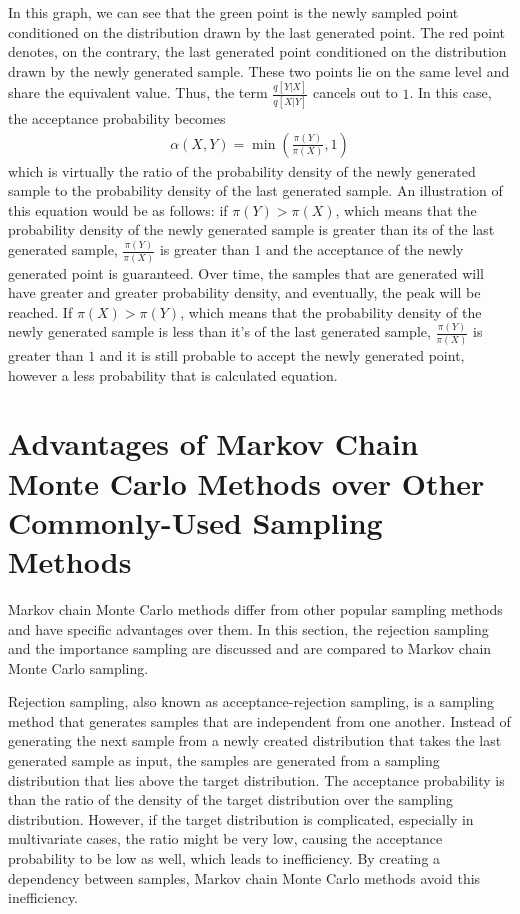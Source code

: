 In this graph, we can see that the green point is the newly sampled point conditioned on the distribution drawn by the last generated point. The red point denotes, on the contrary, the last generated point conditioned on the distribution drawn by the newly generated sample. These two points lie on the same level and share the equivalent value. Thus, the term $\frac{q[Y|X]}{q[X|Y]}$ cancels out to $1$. In this case, the acceptance probability becomes
\begin{align}
\alpha(X, Y) = \min (\frac{\pi(Y)}{\pi(X)}, 1)
\end{align}
which is virtually the ratio of the probability density of the newly generated sample to the probability density of the last generated sample. An illustration of this equation would be as follows: if $\pi(Y) > \pi(X)$, which means that the probability density of the newly generated sample is greater than its of the last generated sample, $\frac{\pi(Y)}{\pi(X)}$ is greater than $1$ and the acceptance of the newly generated point is guaranteed. Over time, the samples that are generated will have greater and greater probability density, and eventually, the peak will be reached. If $\pi(X) > \pi(Y)$, which means that the probability density of the newly generated sample is less than it's of the last generated sample, $\frac{\pi(Y)}{\pi(X)}$ is greater than $1$ and it is still probable to accept the newly generated point, however a less probability that is calculated equation.\cite{understanding_mh}

\section{Advantages of Markov Chain Monte Carlo Methods over Other Commonly-Used Sampling Methods}
Markov chain Monte Carlo methods differ from other popular sampling methods and have specific advantages over them. In this section, the rejection sampling and the importance sampling are discussed and are compared to Markov chain Monte Carlo sampling.

Rejection sampling, also known as acceptance-rejection sampling, is a sampling method that generates samples that are independent from one another. Instead of generating the next sample from a newly created distribution that takes the last generated sample as input, the samples are generated from a sampling distribution that lies above the target distribution. The acceptance probability is than the ratio of the density of the target distribution over the sampling distribution.\cite{mcmc_practice} However, if the target distribution is complicated, especially in multivariate cases, the ratio might be very low, causing the acceptance probability to be low as well, which leads to inefficiency. By creating a dependency between samples, Markov chain Monte Carlo methods avoid this inefficiency.\cite{ComparisonSampling}

